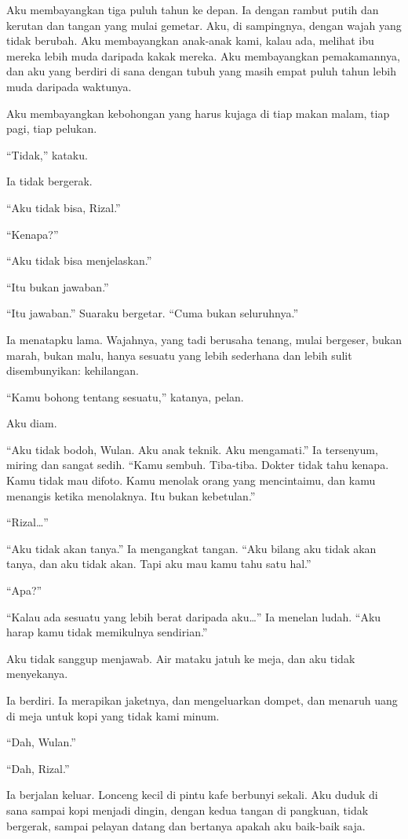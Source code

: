 \documentclass[11pt,twoside,openany]{book}
\begin{document}
Aku membayangkan tiga puluh tahun ke depan. Ia dengan rambut putih dan kerutan dan tangan yang mulai gemetar. Aku, di sampingnya, dengan wajah yang tidak berubah. Aku membayangkan anak-anak kami, kalau ada, melihat ibu mereka lebih muda daripada kakak mereka. Aku membayangkan pemakamannya, dan aku yang berdiri di sana dengan tubuh yang masih empat puluh tahun lebih muda daripada waktunya.

Aku membayangkan kebohongan yang harus kujaga di tiap makan malam, tiap pagi, tiap pelukan.

``Tidak,'' kataku.

Ia tidak bergerak.

``Aku tidak bisa, Rizal.''

``Kenapa?''

``Aku tidak bisa menjelaskan.''

``Itu bukan jawaban.''

``Itu jawaban.'' Suaraku bergetar. ``Cuma bukan seluruhnya.''

Ia menatapku lama. Wajahnya, yang tadi berusaha tenang, mulai bergeser, bukan marah, bukan malu, hanya sesuatu yang lebih sederhana dan lebih sulit disembunyikan: kehilangan.

``Kamu bohong tentang sesuatu,'' katanya, pelan.

Aku diam.

``Aku tidak bodoh, Wulan. Aku anak teknik. Aku mengamati.'' Ia tersenyum, miring dan sangat sedih. ``Kamu sembuh. Tiba-tiba. Dokter tidak tahu kenapa. Kamu tidak mau difoto. Kamu menolak orang yang mencintaimu, dan kamu menangis ketika menolaknya. Itu bukan kebetulan.''

``Rizal\ldots{}''

``Aku tidak akan tanya.'' Ia mengangkat tangan. ``Aku bilang aku tidak akan tanya, dan aku tidak akan. Tapi aku mau kamu tahu satu hal.''

``Apa?''

``Kalau ada sesuatu yang lebih berat daripada aku\ldots{}'' Ia menelan ludah. ``Aku harap kamu tidak memikulnya sendirian.''

Aku tidak sanggup menjawab. Air mataku jatuh ke meja, dan aku tidak menyekanya.

Ia berdiri. Ia merapikan jaketnya, dan mengeluarkan dompet, dan menaruh uang di meja untuk kopi yang tidak kami minum.

``Dah, Wulan.''

``Dah, Rizal.''

Ia berjalan keluar. Lonceng kecil di pintu kafe berbunyi sekali. Aku duduk di sana sampai kopi menjadi dingin, dengan kedua tangan di pangkuan, tidak bergerak, sampai pelayan datang dan bertanya apakah aku baik-baik saja.
\end{document}
